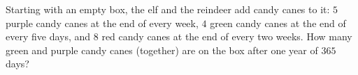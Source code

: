 Starting with an empty box, the elf and the reindeer add candy canes to it: $5$ purple candy canes at the end of every week, $4$ green candy canes at the end of every five days, and $8$ red candy canes at the end of every two weeks. How many green and purple candy canes (together) are on the box after one year of $365$ days?
